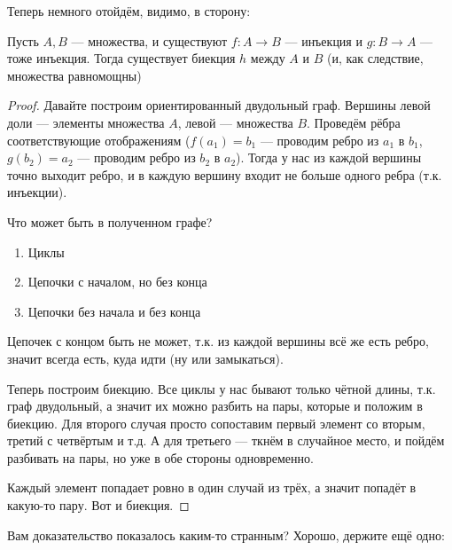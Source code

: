 Теперь немного отойдём, видимо, в сторону:

\begin{theorem}
	Пусть $A, B$ --- множества, и существуют $f : A \to B$ --- инъекция и $g : B \to A$ --- тоже инъекция. Тогда существует биекция $h$ между $A$ и $B$ (и, как следствие, множества равномощны)
\end{theorem}
\begin{proof}
	Давайте построим ориентированный двудольный граф. Вершины левой доли --- элементы множества $A$, левой --- множества $B$. Проведём рёбра соответствующие отображениям ($f(a_1) = b_1$ --- проводим ребро из $a_1$ в $b_1$, $g(b_2) = a_2$ --- проводим ребро из $b_2$ в $a_2$). Тогда у нас из каждой вершины точно выходит ребро, и в каждую вершину входит не больше одного ребра (т.к. инъекции).

	Что может быть в полученном графе?
	\begin{enumerate}
		\item{Циклы}
		\item{Цепочки с началом, но без конца}
		\item{Цепочки без начала и без конца}
	\end{enumerate}
	Цепочек с концом быть не может, т.к. из каждой вершины всё же есть ребро, значит всегда есть, куда идти (ну или замыкаться).

	Теперь построим биекцию. Все циклы у нас бывают только чётной длины, т.к. граф двудольный, а значит их можно разбить на пары, которые и положим в биекцию. Для второго случая просто сопоставим первый элемент со вторым, третий с четвёртым и т.д. А для третьего --- ткнём в случайное место, и пойдём разбивать на пары, но уже в обе стороны одновременно. 

	Каждый элемент попадает ровно в один случай из трёх, а значит попадёт в какую-то пару. Вот и биекция. 
\end{proof}

Вам доказательство показалось каким-то странным? Хорошо, держите ещё одно:

